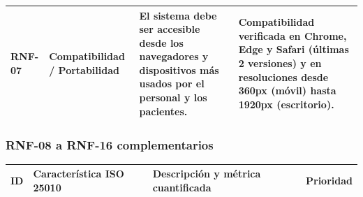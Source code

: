 \documentclass[11pt,a4paper]{article}
\begin{document}
\begin{longtable}{
			p{}
			p{}
			p{}
			p{}
		}
		RNF-07 &
		Compatibilidad / Portabilidad &
		El sistema debe ser accesible desde los navegadores y dispositivos más usados por el personal y los pacientes. &
		Compatibilidad verificada en Chrome, Edge y Safari (últimas 2 versiones) y en resoluciones desde 360px (móvil) hasta 1920px (escritorio). \\
		
		\bottomrule
		
	\end{longtable}
	
	\subsubsection{RNF-08 a RNF-16 complementarios}
	
	\begin{longtable}{p{}
			p{}
			p{}
			p{}}
		
		\toprule
		\textbf{ID} &
		\textbf{Característica ISO 25010} &
		\textbf{Descripción y métrica cuantificada} &
		\textbf{Prioridad}  \\
		\midrule
		\endhead
		

\end{longtable}
\end{document}
